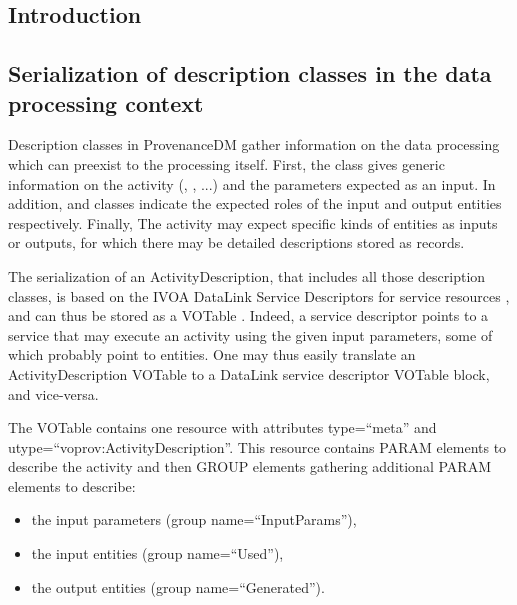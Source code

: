 \subsection{Introduction}
\label{sec:intro-serialization}


\subsection{Serialization of description classes in the data processing context}
\label{sec:description-serialization}

Description classes in ProvenanceDM gather information on the data processing which can preexist to the processing itself.
First, the  class gives generic information on the activity (, , ...) and the parameters expected as an input. In addition,  and  classes indicate the expected roles of the input and output entities respectively. Finally, The activity may expect specific kinds of entities as inputs or outputs, for which there may be detailed descriptions stored as  records.

The serialization of an ActivityDescription, that includes all those description classes, is based on the IVOA DataLink Service Descriptors for service resources \citep{std:Datalink}, and can thus be stored as a VOTable \citep{std:VOTABLE}. Indeed, a service descriptor points to a service that may execute an activity using the given input parameters, some of which probably point to entities. One may thus easily translate an ActivityDescription VOTable to a DataLink service descriptor VOTable block, and vice-versa.

The VOTable contains one resource with attributes type=``meta'' and utype=``voprov:ActivityDescription''. This resource contains PARAM elements to describe the activity and then GROUP elements gathering additional PARAM elements to describe:
\begin{itemize}
 \item the input parameters (group name=``InputParams''),
 \item the input entities (group name=``Used''),
 \item the output entities (group name=``Generated''). 
 \end{itemize}
 
